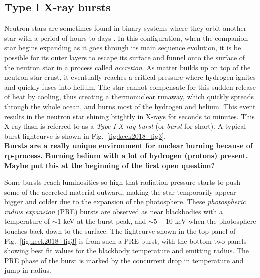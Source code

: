 \documentclass[../main.tex]{subfiles}
\begin{document}
\subsection{Type I X-ray bursts}
Neutron stars are sometimes found in binary systems where they orbit another star with a period of hours to days \citep{Lewin1993}. In this configuration, when the companion star begins expanding as it goes through its main sequence evolution, it is be possible for its outer layers to escape its surface and funnel onto the surface of the neutron star in a process called \textit{accretion}.  As matter builds up on top of the neutron star crust, it eventually reaches a critical pressure where hydrogen ignites and quickly fuses into helium.  The star cannot compensate for this sudden release of heat by cooling, thus creating a thermonuclear runaway, which quickly spreads through the whole ocean, and burns most of the hydrogen and helium. This event results in the neutron star shining brightly in X-rays for seconds to minutes. This X-ray flash is referred to as a \textit{Type I X-ray burst} (or \textit{burst} for short). A typical burst lightcurve is shown in Fig.~\ref{fig:keek2018_fig3}.\\

\textbf{Bursts are a really unique environment for nuclear burning because of rp-process. Burning helium with a lot of hydrogen (protons) present. Maybe put this at the beginning of the first open question?}

Some bursts reach luminosities so high that radiation pressure starts to push some of the accreted material outward, making the star temporarily appear bigger and colder due to the expansion of the photosphere.  These \textit{photospheric radius expansion} (PRE) bursts are observed as near blackbodies with a temperature of $\sim 1$ keV at the burst peak, and $\sim 5-10$ keV when the photosphere touches back down to the surface. The lightcurve shown in the top panel of Fig.~\ref{fig:keek2018_fig3} is from such a PRE burst, with the bottom two panels showing best fit values for the blackbody temperature and emitting radius. The PRE phase of the burst is marked by the concurrent drop in temperature and jump in radius. \\
\end{document}
